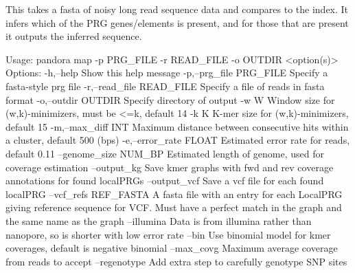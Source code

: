 This takes a fasta of noisy long read sequence data and compares to the index. It infers which of the P\+RG genes/elements is present, and for those that are present it outputs the inferred sequence. \begin{DoxyVerb}  Usage: pandora map -p PRG_FILE -r READ_FILE -o OUTDIR <option(s)>
  Options:
   -h,--help             Show this help message
   -p,--prg_file PRG_FILE    Specify a fasta-style prg file
   -r,--read_file READ_FILE  Specify a file of reads in fasta format
   -o,--outdir OUTDIR            Specify directory of output
   -w W              Window size for (w,k)-minimizers, must be <=k, default 14
   -k K              K-mer size for (w,k)-minimizers, default 15
   -m,--max_diff INT         Maximum distance between consecutive hits within a cluster, default 500 (bps)
   -e,--error_rate FLOAT     Estimated error rate for reads, default 0.11
   --genome_size NUM_BP          Estimated length of genome, used for coverage estimation
   --output_kg           Save kmer graphs with fwd and rev coverage annotations for found localPRGs
   --output_vcf          Save a vcf file for each found localPRG
   --vcf_refs REF_FASTA      A fasta file with an entry for each LocalPRG giving reference sequence for
                                 VCF. Must have a perfect match in the graph and the same name as the graph
   --illumina            Data is from illumina rather than nanopore, so is shorter with low error rate
   --bin             Use binomial model for kmer coverages, default is negative binomial
   --max_covg            Maximum average coverage from reads to accept
   --regenotype          Add extra step to carefully genotype SNP sites\end{DoxyVerb}
 